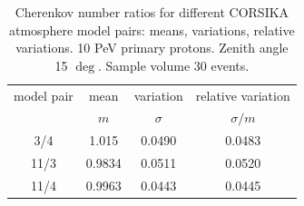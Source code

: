 \documentclass[final,5p,times,twocolumn]{elsarticle}
\begin{document}
\begin{table}[t]
\centering
\caption{Cherenkov number ratios for different CORSIKA atmosphere model pairs: means, variations, relative variations. 10 PeV primary protons. Zenith angle 15 $\deg$. Sample volume 30 events.}
\label{tab:atmmod}
\vspace{1pc}
\begin{tabular}{|c||c|c|c|}
\hline
model pair  & mean &  variation   & relative variation \\ 
            &  $m$ & $\sigma$     & $\sigma/m$          \\ 
\hline 
\hline 
 3/4 &  1.015    &  0.0490     &   0.0483   \\
\hline
11/3 &  0.9834    &  0.0511     &   0.0520    \\
\hline
11/4 &  0.9963    &  0.0443     &   0.0445    \\
\hline
\end{tabular}
\end{table}
\end{document}
